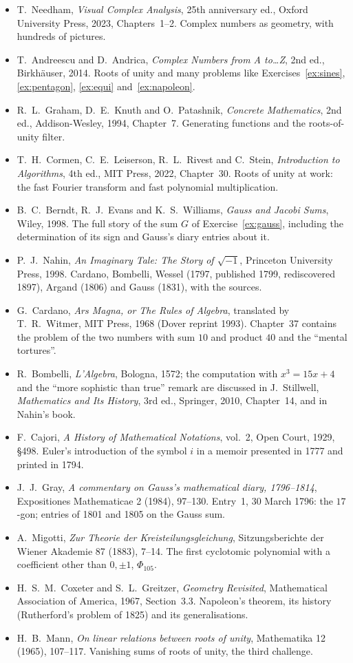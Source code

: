 \begin{itemize}
\item T.~Needham, \emph{Visual Complex Analysis}, 25th anniversary ed., Oxford University Press, 2023, Chapters~1--2. Complex numbers as geometry, with hundreds of pictures.
\item T.~Andreescu and D.~Andrica, \emph{Complex Numbers from A to\dots Z}, 2nd ed., Birkh\"auser, 2014. Roots of unity and many problems like Exercises~\ref{ex:sines}, \ref{ex:pentagon}, \ref{ex:equi} and~\ref{ex:napoleon}.
\item R.~L.~Graham, D.~E.~Knuth and O.~Patashnik, \emph{Concrete Mathematics}, 2nd ed., Addison-Wesley, 1994, Chapter~7. Generating functions and the roots-of-unity filter.
\item T.~H.~Cormen, C.~E.~Leiserson, R.~L.~Rivest and C.~Stein, \emph{Introduction to Algorithms}, 4th ed., MIT Press, 2022, Chapter~30. Roots of unity at work: the fast Fourier transform and fast polynomial multiplication.
\item B.~C.~Berndt, R.~J.~Evans and K.~S.~Williams, \emph{Gauss and Jacobi Sums}, Wiley, 1998. The full story of the sum $G$ of Exercise~\ref{ex:gauss}, including the determination of its sign and Gauss's diary entries about it.
\item P.~J.~Nahin, \emph{An Imaginary Tale: The Story of $\sqrt{-1}$}, Princeton University Press, 1998. Cardano, Bombelli, Wessel (1797, published 1799, rediscovered 1897), Argand (1806) and Gauss (1831), with the sources.
\item G.~Cardano, \emph{Ars Magna, or The Rules of Algebra}, translated by T.~R.~Witmer, MIT Press, 1968 (Dover reprint 1993). Chapter~37 contains the problem of the two numbers with sum $10$ and product $40$ and the ``mental tortures''.
\item R.~Bombelli, \emph{L'Algebra}, Bologna, 1572; the computation with $x^3=15x+4$ and the ``more sophistic than true'' remark are discussed in J.~Stillwell, \emph{Mathematics and Its History}, 3rd ed., Springer, 2010, Chapter~14, and in Nahin's book.
\item F.~Cajori, \emph{A History of Mathematical Notations}, vol.~2, Open Court, 1929, \S498. Euler's introduction of the symbol $i$ in a memoir presented in 1777 and printed in 1794.
\item J.~J.~Gray, \emph{A commentary on Gauss's mathematical diary, 1796--1814}, Expositiones Mathematicae 2 (1984), 97--130. Entry~1, 30 March 1796: the $17$-gon; entries of 1801 and 1805 on the Gauss sum.
\item A.~Migotti, \emph{Zur Theorie der Kreisteilungsgleichung}, Sitzungsberichte der Wiener Akademie 87 (1883), 7--14. The first cyclotomic polynomial with a coefficient other than $0,\pm1$, $\Phi_{105}$.
\item H.~S.~M.~Coxeter and S.~L.~Greitzer, \emph{Geometry Revisited}, Mathematical Association of America, 1967, Section~3.3. Napoleon's theorem, its history (Rutherford's problem of 1825) and its generalisations.
\item H.~B.~Mann, \emph{On linear relations between roots of unity}, Mathematika 12 (1965), 107--117. Vanishing sums of roots of unity, the third challenge.
\end{itemize}
